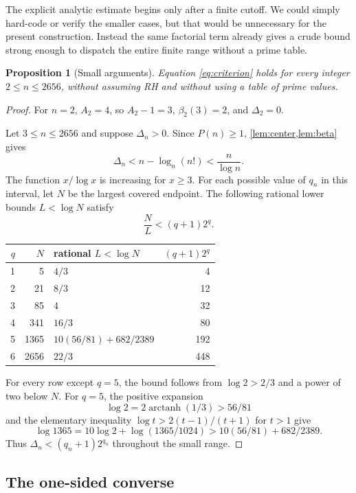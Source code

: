 \documentclass[10pt]{article}
\newtheorem{proposition}[theorem]{Proposition}
\theoremstyle{definition}
\begin{document}
The explicit analytic estimate begins only after a finite cutoff. We could
simply hard-code or verify the smaller cases, but that would be
unnecessary for the present construction. Instead the
same factorial term already gives a crude bound strong enough to dispatch the
entire finite range without a prime table.

\begin{proposition}[Small arguments]
\label{prop:forwardsmall}
Equation \eqref{eq:criterion} holds for every integer $2\le n\le2656$, without
assuming RH and without using a table of prime values.
\end{proposition}

\begin{proof}
For $n=2$, $A_2=4$, so $A_2-1=3$, $\beta_2(3)=2$, and $\Delta_2=0$.

Let $3\le n\le2656$ and suppose $\Delta_n>0$. Since $P(n)\ge1$,
\cref{lem:center,lem:beta} gives
\[
\Delta_n<n-\log_n(n!)<\frac{n}{\log n}.
\]
The function $x/\log x$ is increasing for $x\ge3$. For each possible value of
$q_n$ in this interval, let $N$ be the largest covered endpoint. The following
rational lower bounds $L<\log N$ satisfy
\[
\frac NL<(q+1)2^q.
\]
\begin{center}
\begin{tabular}{@{}rrlr@{}}\toprule
$q$ & $N$ & rational $L<\log N$ & $(q+1)2^q$\\\midrule
1&5&$4/3$&4\\
2&21&$8/3$&12\\
3&85&$4$&32\\
4&341&$16/3$&80\\
5&1365&$10(56/81)+682/2389$&192\\
6&2656&$22/3$&448\\\bottomrule
\end{tabular}
\end{center}
For every row except $q=5$, the bound follows from $\log2>2/3$ and a power of
two below $N$. For $q=5$, the positive expansion
\[
\log2=2\operatorname{arctanh}(1/3)>56/81
\]
and the elementary inequality $\log t>2(t-1)/(t+1)$ for $t>1$ give
\[
\log1365
=10\log2+\log(1365/1024)
>10(56/81)+682/2389.
\]
Thus $\Delta_n<(q_n+1)2^{q_n}$ throughout the small range.
\end{proof}

\subsection{The one-sided converse}
\end{document}
